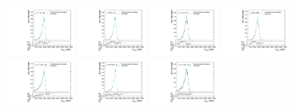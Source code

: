 \begin{figure}[htpb]
  \centering
  \includegraphics[width=0.2\textwidth]{fig/analysisAppendix/templateVsReco_WprToWH2000_r0_MVV_mu_HP_bb_LDy_linear.pdf}
  \includegraphics[width=0.2\textwidth]{fig/analysisAppendix/templateVsReco_WprToWH2000_r0_MVV_mu_LP_bb_LDy_linear.pdf}
  \includegraphics[width=0.2\textwidth]{fig/analysisAppendix/templateVsReco_WprToWH2000_r0_MVV_mu_HP_bb_HDy_linear.pdf}
  \includegraphics[width=0.2\textwidth]{fig/analysisAppendix/templateVsReco_WprToWH2000_r0_MVV_mu_LP_bb_HDy_linear.pdf}\\
  \includegraphics[width=0.2\textwidth]{fig/analysisAppendix/templateVsReco_WprToWH2000_r0_MVV_mu_HP_nobb_LDy_linear.pdf}
  \includegraphics[width=0.2\textwidth]{fig/analysisAppendix/templateVsReco_WprToWH2000_r0_MVV_mu_LP_nobb_LDy_linear.pdf}
  \includegraphics[width=0.2\textwidth]{fig/analysisAppendix/templateVsReco_WprToWH2000_r0_MVV_mu_HP_nobb_HDy_linear.pdf}

\end{figure}
